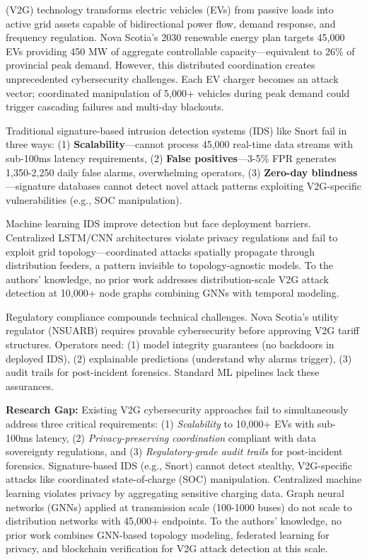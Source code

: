 \documentclass[journal]{IEEEtran}
\begin{document}
 (V2G) technology transforms electric vehicles (EVs) from passive loads into active grid assets capable of bidirectional power flow, demand response, and frequency regulation. Nova Scotia's 2030 renewable energy plan targets 45,000 EVs providing 450 MW of aggregate controllable capacity—equivalent to 26\% of provincial peak demand. However, this distributed coordination creates unprecedented cybersecurity challenges. Each EV charger becomes an attack vector; coordinated manipulation of 5,000+ vehicles during peak demand could trigger cascading failures and multi-day blackouts.

Traditional signature-based intrusion detection systems (IDS) like Snort fail in three ways: (1) \textbf{Scalability}—cannot process 45,000 real-time data streams with sub-100ms latency requirements, (2) \textbf{False positives}—3-5\% FPR generates 1,350-2,250 daily false alarms, overwhelming operators, (3) \textbf{Zero-day blindness}—signature databases cannot detect novel attack patterns exploiting V2G-specific vulnerabilities (e.g., SOC manipulation).

Machine learning IDS improve detection but face deployment barriers. Centralized LSTM/CNN architectures violate privacy regulations and fail to exploit grid topology—coordinated attacks spatially propagate through distribution feeders, a pattern invisible to topology-agnostic models. To the authors' knowledge, no prior work addresses distribution-scale V2G attack detection at 10,000+ node graphs combining GNNs with temporal modeling.

Regulatory compliance compounds technical challenges. Nova Scotia's utility regulator (NSUARB) requires provable cybersecurity before approving V2G tariff structures. Operators need: (1) model integrity guarantees (no backdoors in deployed IDS), (2) explainable predictions (understand why alarms trigger), (3) audit trails for post-incident forensics. Standard ML pipelines lack these assurances.

\textbf{Research Gap:} Existing V2G cybersecurity approaches fail to simultaneously address three critical requirements: (1) \textit{Scalability} to 10,000+ EVs with sub-100ms latency, (2) \textit{Privacy-preserving coordination} compliant with data sovereignty regulations, and (3) \textit{Regulatory-grade audit trails} for post-incident forensics. Signature-based IDS (e.g., Snort) cannot detect stealthy, V2G-specific attacks like coordinated state-of-charge (SOC) manipulation. Centralized machine learning violates privacy by aggregating sensitive charging data. Graph neural networks (GNNs) applied at transmission scale (100-1000 buses) do not scale to distribution networks with 45,000+ endpoints. To the authors' knowledge, no prior work combines GNN-based topology modeling, federated learning for privacy, and blockchain verification for V2G attack detection at this scale.
\end{document}
